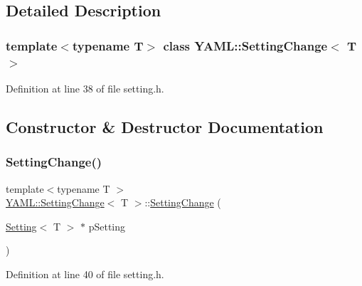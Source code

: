 \subsection{Detailed Description}
\subsubsection*{template$<$typename T$>$\newline
class Y\+A\+M\+L\+::\+Setting\+Change$<$ T $>$}



Definition at line 38 of file setting.\+h.



\subsection{Constructor \& Destructor Documentation}
\mbox{\label{class_y_a_m_l_1_1_setting_change_a93fc1771021b72f7dc2672d89aaae044}} 
\subsubsection{\texorpdfstring{SettingChange()}{SettingChange()}\hspace{0.1cm}{\footnotesize\ttfamily [1/3]}}
{\footnotesize\ttfamily template$<$typename T $>$ \\
\mbox{\hyperlink{class_y_a_m_l_1_1_setting_change}{Y\+A\+M\+L\+::\+Setting\+Change}}$<$ T $>$\+::\mbox{\hyperlink{class_y_a_m_l_1_1_setting_change}{Setting\+Change}} (\begin{DoxyParamCaption}\item[{\mbox{\hyperlink{class_y_a_m_l_1_1_setting}{Setting}}$<$ T $>$ $\ast$}]{p\+Setting }\end{DoxyParamCaption})\hspace{0.3cm}{\ttfamily [inline]}}



Definition at line 40 of file setting.\+h.

\mbox{\label{class_y_a_m_l_1_1_setting_change_a76d8b17ce29951b841b668b27e8306ac}} 
